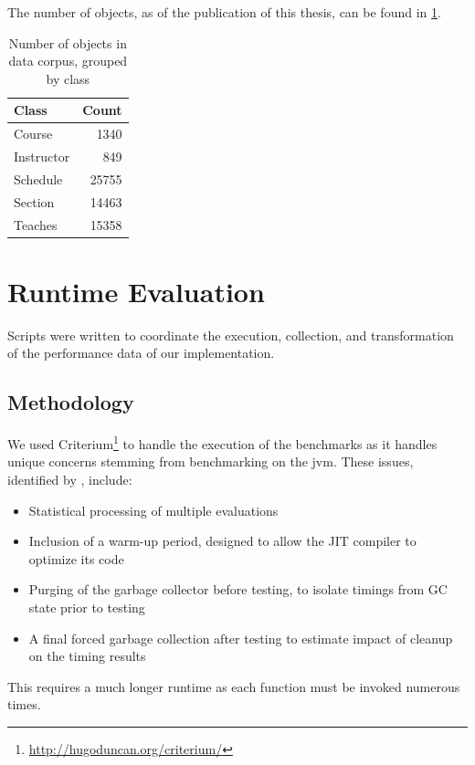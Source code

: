 		The number of objects, as of the publication of this thesis, can be found in \cref{tbl:data-corpus-count}.
		
		\begin{table}[H]
			\centering
			\begin{tabular}{lr}
			\toprule
			Class & Count \\
			\midrule
			Course & 1340 \\
			Instructor & 849 \\
			Schedule & 25755 \\
			Section & 14463 \\
			Teaches & 15358 \\
			\bottomrule
			\end{tabular}
			
			\caption{Number of objects in data corpus, grouped by class}
			\label{tbl:data-corpus-count}
		\end{table}
	
	\section{Runtime Evaluation}
	\label{sec:runtime-evaluation}
		Scripts were written to coordinate the execution, collection, and transformation of the performance data of our implementation.
		
		\subsection{Methodology}
			We used Criterium\footnote{\url{http://hugoduncan.org/criterium/}} to handle the execution of the benchmarks as it handles unique concerns stemming from benchmarking on the \gls{jvm}.  These issues, identified by \citeauthor{rob-java-bench-08} \cite{rob-java-bench-08}, include:
			
			\begin{itemize}
				\item Statistical processing of multiple evaluations
				\item Inclusion of a warm-up period, designed to allow the JIT compiler to optimize its code
				\item Purging of the garbage collector before testing, to isolate timings from GC state prior to testing
				\item A final forced garbage collection after testing to estimate impact of cleanup on the timing results
			\end{itemize}
		
			This requires a much longer runtime as each function must be invoked numerous times.
			
